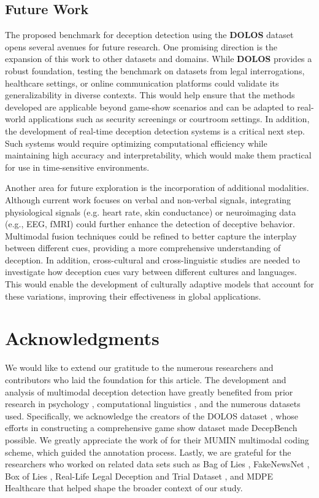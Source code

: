 \documentclass{article} %
\begin{document}
\subsection{Future Work}

The proposed benchmark for deception detection using the \textbf{DOLOS} dataset opens several avenues for future research. One promising direction is the expansion of this work to other datasets and domains. While \textbf{DOLOS} provides a robust foundation, testing the benchmark on datasets from legal interrogations, healthcare settings, or online communication platforms could validate its generalizability in diverse contexts. This would help ensure that the methods developed are applicable beyond game-show scenarios and can be adapted to real-world applications such as security screenings or courtroom settings. In addition, the development of real-time deception detection systems is a critical next step. Such systems would require optimizing computational efficiency while maintaining high accuracy and interpretability, which would make them practical for use in time-sensitive environments.

Another area for future exploration is the incorporation of additional modalities. Although current work focuses on verbal and non-verbal signals, integrating physiological signals (e.g. heart rate, skin conductance) or neuroimaging data (e.g., EEG, fMRI) could further enhance the detection of deceptive behavior. Multimodal fusion techniques could be refined to better capture the interplay between different cues, providing a more comprehensive understanding of deception. In addition, cross-cultural and cross-linguistic studies are needed to investigate how deception cues vary between different cultures and languages. This would enable the development of culturally adaptive models that account for these variations, improving their effectiveness in global applications.
\section*{Acknowledgments}
We would like to extend our gratitude to the numerous researchers and contributors who laid the foundation for this article. The development and analysis of multimodal deception detection have greatly benefited from prior research in psychology \citep{Vrij2008, 10.1177/0963721410391245, Masip2005, Buller1996, Hauch2015, 10.1177/0261927X02021004001}, computational linguistics \citep{feng-etal-2012-characterizing}, and the numerous datasets used. Specifically, we acknowledge the creators of the DOLOS dataset \citep{guo2023audiovisualdeceptiondetectiondolos}, whose efforts in constructing a comprehensive game show dataset made DecepBench possible. We greatly appreciate the work of \citep{article} for their MUMIN multimodal coding scheme, which guided the annotation process. Lastly, we are grateful for the researchers who worked on related data sets such as Bag of Lies \citep{9025340}, FakeNewsNet \citep{shu2019fakenewsnet}, Box of Lies \citep{soldner2019box}, Real-Life Legal Deception and Trial Dataset \citep{perez2015deception, fornaciari2014identifying}, and MDPE Healthcare \citep{cai2024mdpemultimodaldeceptiondataset} that helped shape the broader context of our study. 
\end{document}

